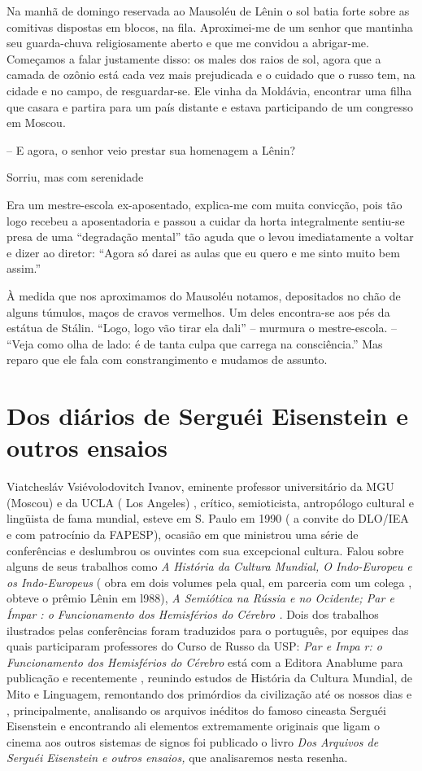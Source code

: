 Na manhã de domingo reservada ao Mausoléu de Lênin o sol batia forte
sobre as comitivas dispostas em blocos, na fila. Aproximei-me de um
senhor que mantinha seu guarda-chuva religiosamente aberto e que me
convidou a abrigar-me. Começamos a falar justamente disso: os males dos
raios de sol, agora que a camada de ozônio está cada vez mais
prejudicada e o cuidado que o russo tem, na cidade e no campo, de
resguardar-se. Ele vinha da Moldávia, encontrar uma filha que casara e
partira para um país distante e estava participando de um congresso em
Moscou.

-- E agora, o senhor veio prestar sua homenagem a Lênin?

Sorriu, mas com serenidade

Era um mestre-escola ex-aposentado, explica-me com muita convicção, pois
tão logo recebeu a aposentadoria e passou a cuidar da horta
integralmente sentiu-se presa de uma ``degradação mental'' tão aguda que
o levou imediatamente a voltar e dizer ao diretor: ``Agora só darei as
aulas que eu quero e me sinto muito bem assim.''

À medida que nos aproximamos do Mausoléu notamos, depositados no chão de
alguns túmulos, maços de cravos vermelhos. Um deles encontra-se aos pés
da estátua de Stálin. ``Logo, logo vão tirar ela dali'' -- murmura o
mestre-escola. -- ``Veja como olha de lado: é de tanta culpa que carrega
na consciência.'' Mas reparo que ele fala com constrangimento e mudamos
de assunto.

\chapter{Dos diários de Serguéi Eisenstein e outros ensaios}

Viatchesláv Vsiévolodovitch Ivanov, eminente professor universitário da
MGU (Moscou) e da UCLA ( Los Angeles) , crítico, semioticista,
antropólogo cultural e lingüista de fama mundial, esteve em S. Paulo em
1990 ( a convite do DLO/IEA e com patrocínio da FAPESP), ocasião em que
ministrou uma série de conferências e deslumbrou os ouvintes com sua
excepcional cultura. Falou sobre alguns de seus trabalhos como \emph{A}
\emph{História da Cultura Mundial, O Indo-Europeu e os Indo-Europeus} (
obra em dois volumes pela qual, em parceria com um colega , obteve o
prêmio Lênin em l988), \emph{A Semiótica na Rússia e no Ocidente; Par e
Ímpar : o Funcionamento dos Hemisférios do Cérebro .} Dois dos trabalhos
ilustrados pelas conferências foram traduzidos para o português, por
equipes das quais participaram professores do Curso de Russo da USP:
\emph{Par e Impa r: o Funcionamento dos Hemisférios do Cérebro} está com
a Editora Anablume para publicação e recentemente , reunindo estudos de
História da Cultura Mundial, de Mito e Linguagem, remontando dos
primórdios da civilização até os nossos dias e , principalmente,
analisando os arquivos inéditos do famoso cineasta Serguéi Eisenstein e
encontrando ali elementos extremamente originais que ligam o cinema aos
outros sistemas de signos foi publicado o livro \emph{Dos Arquivos de
Serguéi Eisenstein e outros ensaios,} que analisaremos nesta resenha.

